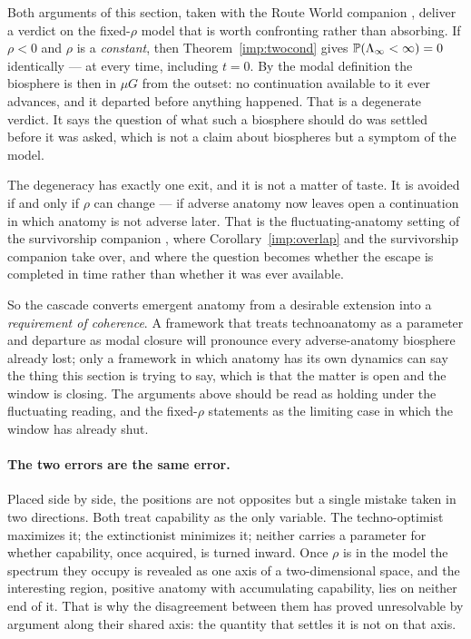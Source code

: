 \begin{remark}
\label{hr:rem:forcesprocess}
Both arguments of this section, taken with
the Route World companion \cite{GoldenRouteWorld}, deliver a verdict on the fixed-$\rho$ model
that is worth confronting rather than absorbing. If $\rho<0$ and $\rho$ is a \emph{constant}, then
Theorem~\ref{imp:twocond} gives
$\mathbb{P}(\Lambda_\infty<\infty)=0$ identically --- at every time, including
$t=0$. By the modal definition the biosphere is then in $\mu G$ from the
outset: no continuation available to it ever advances, and it departed
before anything happened. That is a degenerate verdict. It says the
question of what such a biosphere should do was settled before it was
asked, which is not a claim about biospheres but a symptom of the
model.

The degeneracy has exactly one exit, and it is not a matter of taste.
It is avoided if and only if $\rho$ can change --- if adverse anatomy
now leaves open a continuation in which anatomy is not adverse later.
That is the fluctuating-anatomy setting of
the survivorship companion \cite{GoldenSurvivorship}, where
Corollary~\ref{imp:overlap} and
the survivorship companion \cite{GoldenSurvivorship} take over, and where the question
becomes whether the escape is completed in time rather than whether it
was ever available.

So the cascade converts emergent anatomy from a desirable extension
into a \emph{requirement of coherence}. A framework that treats
technoanatomy as a parameter and departure as modal closure will
pronounce every adverse-anatomy biosphere already lost; only a
framework in which anatomy has its own dynamics can say the thing this
section is trying to say, which is that the matter is open and the
window is closing. The arguments above should be read as holding under
the fluctuating reading, and the fixed-$\rho$ statements as the
limiting case in which the window has already shut.
\end{remark}

\paragraph{The two errors are the same error.}\label{hr:rem:sameerror}
Placed side by side, the positions are not opposites but a single
mistake taken in two directions. Both treat capability as the only
variable. The techno-optimist maximizes it; the extinctionist minimizes
it; neither carries a parameter for whether capability, once acquired,
is turned inward. Once $\rho$ is in the model the spectrum they occupy
is revealed as one axis of a two-dimensional space, and the interesting
region, positive anatomy with accumulating capability, lies on
neither end of it. That is why the disagreement between them has proved
unresolvable by argument along their shared axis: the quantity that
settles it is not on that axis.


